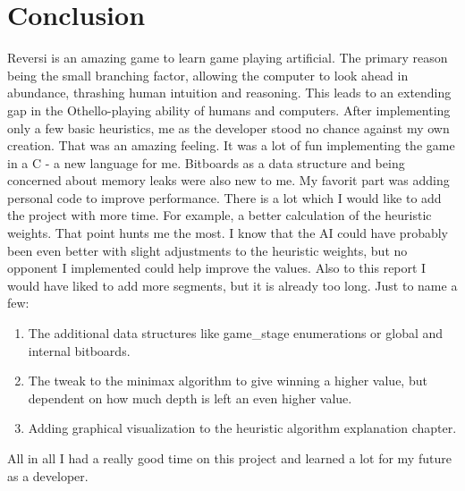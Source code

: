
\chapter{Conclusion}\label{chapter:conclusion}
Reversi is an amazing game to learn game playing artificial. The primary reason being the small branching factor, allowing the computer to look ahead in abundance, thrashing human intuition and reasoning. This leads to an extending gap in the Othello-playing ability of humans and computers. After implementing only a few basic heuristics, me as the developer stood no chance against my own creation. That was an amazing feeling. \newline It was a lot of fun implementing the game in a C - a new language for me. Bitboards as a data structure and being concerned about memory leaks were also new to me. My favorit part was adding personal code to improve performance. There is a lot which I would like to add the project with more time. For example, a better calculation of the heuristic weights. That point hunts me the most. I know that the AI could have probably been even better with slight adjustments to the heuristic weights, but no opponent I implemented could help improve the values. \newline Also to this report I would have liked to add more segments, but it is already too long. Just to name a few:
\begin{enumerate}
	\item The additional data structures like game\_stage enumerations or global and internal bitboards.
	\item The tweak to the minimax algorithm to give winning a higher value, but dependent on how much depth is left an even higher value.
	\item Adding graphical visualization to the heuristic algorithm explanation chapter.
\end{enumerate}
All in all I had a really good time on this project and learned a lot for my future as a developer.

